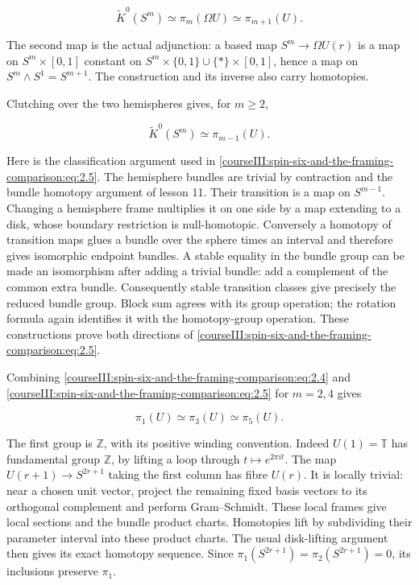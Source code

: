 \begin{equation}
\widetilde K^0(S^m)\simeq\pi_m(\Omega U)
\simeq\pi_{m+1}(U).
\label{courseIII:spin-six-and-the-framing-comparison:eq:2.4}
\end{equation}

The second map is the actual adjunction: a based map \(S^m\to\Omega U(r)\) is a map on \(S^m\times[0,1]\) constant on \(S^m\times\{0,1\}\cup\{*\}\times[0,1]\), hence a map on \(S^m\wedge S^1=S^{m+1}\). The construction and its inverse also carry homotopies.

Clutching over the two hemispheres gives, for \(m\geq2\),

\begin{equation}
\widetilde K^0(S^m)\simeq\pi_{m-1}(U).
\label{courseIII:spin-six-and-the-framing-comparison:eq:2.5}
\end{equation}

Here is the classification argument used in \eqref{courseIII:spin-six-and-the-framing-comparison:eq:2.5}. The hemisphere bundles are trivial by contraction and the bundle homotopy argument of lesson 11. Their transition is a map on \(S^{m-1}\). Changing a hemisphere frame multiplies it on one side by a map extending to a disk, whose boundary restriction is null-homotopic. Conversely a homotopy of transition maps glues a bundle over the sphere times an interval and therefore gives isomorphic endpoint bundles. A stable equality in the bundle group can be made an isomorphism after adding a trivial bundle: add a complement of the common extra bundle. Consequently stable transition classes give precisely the reduced bundle group. Block sum agrees with its group operation; the rotation formula again identifies it with the homotopy-group operation. These constructions prove both directions of \eqref{courseIII:spin-six-and-the-framing-comparison:eq:2.5}.

Combining \eqref{courseIII:spin-six-and-the-framing-comparison:eq:2.4} and \eqref{courseIII:spin-six-and-the-framing-comparison:eq:2.5} for \(m=2,4\) gives

\begin{equation}
\pi_1(U)\simeq\pi_3(U)\simeq\pi_5(U).
\label{courseIII:spin-six-and-the-framing-comparison:eq:2.6}
\end{equation}

The first group is \(\mathbb Z\), with its positive winding convention. Indeed \(U(1)=\mathbb T\) has fundamental group \(\mathbb Z\), by lifting a loop through \(t\mapsto e^{2\pi it}\). The map \(U(r+1)\to S^{2r+1}\) taking the first column has fibre \(U(r)\). It is locally trivial: near a chosen unit vector, project the remaining fixed basis vectors to its orthogonal complement and perform Gram--Schmidt. These local frames give local sections and the bundle product charts. Homotopies lift by subdividing their parameter interval into these product charts. The usual disk-lifting argument then gives its exact homotopy sequence. Since \(\pi_1(S^{2r+1})=\pi_2(S^{2r+1})=0\), its inclusions preserve \(\pi_1\).

